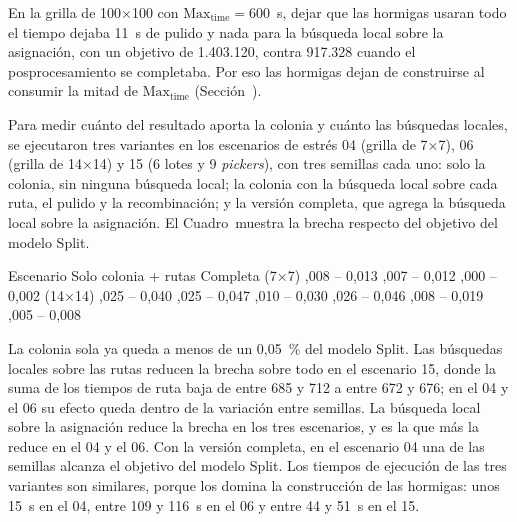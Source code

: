 En la grilla de 100×100 con $\text{Max}_{\text{time}} = 600$~s, dejar que
las hormigas usaran todo el tiempo dejaba 11~s de pulido y nada para la
búsqueda local sobre la asignación, con un objetivo de 1.403.120, contra
917.328 cuando el posprocesamiento se completaba. Por eso las hormigas
dejan de construirse al consumir la mitad de $\text{Max}_{\text{time}}$
(Sección~).

\stopsubsection

\startsubsection[title={Contribución de la búsqueda local}, reference=sec:calib_aco_ablacion]

Para medir cuánto del resultado aporta la colonia y cuánto las búsquedas
locales, se ejecutaron tres variantes en los escenarios de estrés 04 (grilla
de 7×7), 06 (grilla de 14×14) y 15 (6 lotes y 9 {\em pickers}), con tres
semillas cada uno: solo la colonia, sin ninguna búsqueda local; la colonia
con la búsqueda local sobre cada ruta, el pulido y la recombinación; y la
versión completa, que agrega la búsqueda local sobre la asignación. El
Cuadro~ muestra la brecha respecto del objetivo del
modelo Split.

\startplacetable[reference=tab:aco_ablacion, location=here, title={Brecha de \ac{aco} respecto del modelo Split, en porcentaje, por variante (mínimo y máximo sobre tres semillas).}]
\bTABLE[split=yes, align=middle, frame=on, width=fit]
\setupTABLE[row][1][background=color, backgroundcolor=darkgray, style=bold]
\setupTABLE[column][2,3,4][align=flushright]
\bTR \bTH Escenario \eTH \bTH Solo colonia \eTH \bTH + rutas \eTH \bTH Completa \eTH \eTR
\bTR {} (7×7) \eTD {},008 -- 0,013 \eTD {},007 -- 0,012 \eTD {},000 -- 0,002 \eTD \eTR
\bTR {} (14×14) \eTD {},025 -- 0,040 \eTD {},025 -- 0,047 \eTD {},010 -- 0,030 \eTD \eTR
\bTR {} \eTD {},026 -- 0,046 \eTD {},008 -- 0,019 \eTD {},005 -- 0,008 \eTD \eTR
\eTABLE
\stopplacetable

La colonia sola ya queda a menos de un 0,05~\% del modelo Split. Las
búsquedas locales sobre las rutas reducen la brecha sobre todo en el
escenario 15, donde la suma de los tiempos de ruta baja de entre 685 y 712 a
entre 672 y 676; en el 04 y el 06 su efecto queda dentro de la variación
entre semillas. La búsqueda local sobre la asignación reduce la brecha en
los tres escenarios, y es la que más la reduce en el 04 y el 06. Con la
versión completa, en el escenario 04 una de las semillas alcanza el objetivo
del modelo Split. Los tiempos de ejecución de las tres variantes son
similares, porque los domina la construcción de las hormigas: unos 15~s en
el 04, entre 109 y 116~s en el 06 y entre 44 y 51~s en el 15.

